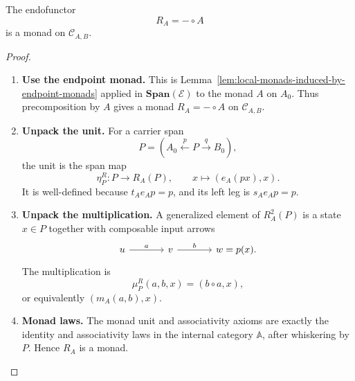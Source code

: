 \begin{proposition}
\label{prop:input-processing-monad}
    The endofunctor
    \[
        R_A=-\circ A
    \]
    is a monad on \(\mathcal C_{A,B}\).
\end{proposition}
\begin{proof}
    \leavevmode
    \begin{enumerate}
        \item \textbf{Use the endpoint monad.} This is Lemma~\ref{lem:local-monads-induced-by-endpoint-monads} applied in \(\mathbf{Span}(\mathcal E)\) to the monad \(A\) on \(A_0\). Thus precomposition by \(A\) gives a monad \(R_A=-\circ A\) on \(\mathcal C_{A,B}\).

        \item \textbf{Unpack the unit.} For a carrier span
        \[
            P=
            \left(
                A_0
                \xleftarrow{p}
                P
                \xrightarrow{q}
                B_0
            \right),
        \]
        the unit is the span map
        \[
            \eta^R_P:P\to R_A(P),
            \qquad
            x\longmapsto(e_A(px),x).
        \]
        It is well-defined because \(t_Ae_Ap=p\), and its left leg is \(s_Ae_Ap=p\).

        \item \textbf{Unpack the multiplication.}
        A generalized element of \(R_A^2(P)\) is a state \(x\in P\) together with composable input arrows
        \[
            \begin{tikzcd}[column sep=large]
                    u 
                        \arrow[r, "a"] 
                & 
                    v 
                        \arrow[r, "b"] 
                & 
                    w=p(x).
            \end{tikzcd}
        \]
        The multiplication is
        \[
            \mu^R_P(a,b,x)=(b\circ a,x),
        \]
        or equivalently \((m_A(a,b),x)\).

        \item \textbf{Monad laws.} The monad unit and associativity axioms are exactly the identity and associativity laws in the internal category \(\mathbb A\), after whiskering by \(P\). Hence \(R_A\) is a monad.
    \end{enumerate}
\end{proof}

